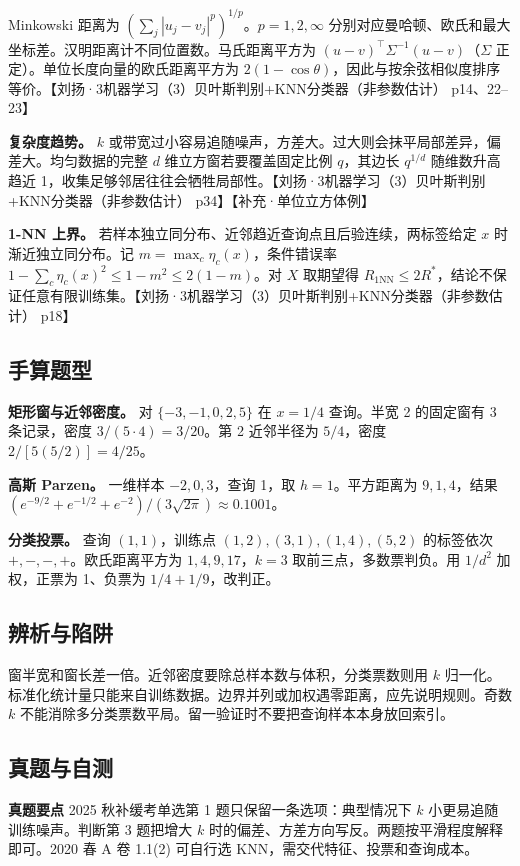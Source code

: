\documentclass[UTF8,a4paper,zihao=-4,fontset=fandol]{ctexart}
\begin{document}
Minkowski 距离为 \((\sum_j|u_j-v_j|^p)^{1/p}\)。\(p=1,2,\infty\) 分别对应曼哈顿、欧氏和最大坐标差。汉明距离计不同位置数。马氏距离平方为 \((u-v)^\top\Sigma^{-1}(u-v)\)（\(\Sigma\) 正定）。单位长度向量的欧氏距离平方为 \(2(1-\cos\theta)\)，因此与按余弦相似度排序等价。【刘扬·3机器学习（3）贝叶斯判别+KNN分类器（非参数估计） p14、22–23】

\textbf{复杂度趋势。} \(k\) 或带宽过小容易追随噪声，方差大。过大则会抹平局部差异，偏差大。均匀数据的完整 \(d\) 维立方窗若要覆盖固定比例 \(q\)，其边长 \(q^{1/d}\) 随维数升高趋近 1，收集足够邻居往往会牺牲局部性。【刘扬·3机器学习（3）贝叶斯判别+KNN分类器（非参数估计） p34】【补充·单位立方体例】

\textbf{1-NN 上界。} 若样本独立同分布、近邻趋近查询点且后验连续，两标签给定 \(x\) 时渐近独立同分布。记 \(m=\max_c\eta_c(x)\)，条件错误率 \(1-\sum_c\eta_c(x)^2\le1-m^2\le2(1-m)\)。对 \(X\) 取期望得 \(R_{1\mathrm{NN}}\le 2R^*\)，结论不保证任意有限训练集。【刘扬·3机器学习（3）贝叶斯判别+KNN分类器（非参数估计） p18】

\subsection{手算题型}
\textbf{矩形窗与近邻密度。} 对 \(\{-3,-1,0,2,5\}\) 在 \(x=1/4\) 查询。半宽 2 的固定窗有 3 条记录，密度 \(3/(5\cdot4)=3/20\)。第 2 近邻半径为 \(5/4\)，密度 \(2/[5(5/2)]=4/25\)。

\textbf{高斯 Parzen。} 一维样本 \(-2,0,3\)，查询 1，取 \(h=1\)。平方距离为 \(9,1,4\)，结果 \((e^{-9/2}+e^{-1/2}+e^{-2})/(3\sqrt{2\pi})\approx0.1001\)。

\textbf{分类投票。} 查询 \((1,1)\)，训练点 \((1,2),(3,1),(1,4),(5,2)\) 的标签依次 \(+,-,-,+\)。欧氏距离平方为 \(1,4,9,17\)，\(k=3\) 取前三点，多数票判负。用 \(1/d^2\) 加权，正票为 1、负票为 \(1/4+1/9\)，改判正。

\subsection{辨析与陷阱}
窗半宽和窗长差一倍。近邻密度要除总样本数与体积，分类票数则用 \(k\) 归一化。标准化统计量只能来自训练数据。边界并列或加权遇零距离，应先说明规则。奇数 \(k\) 不能消除多分类票数平局。留一验证时不要把查询样本本身放回索引。

\subsection{真题与自测}
\textbf{真题要点} 2025 秋补缓考单选第 1 题只保留一条选项：典型情况下 \(k\) 小更易追随训练噪声。判断第 3 题把增大 \(k\) 时的偏差、方差方向写反。两题按平滑程度解释即可。2020 春 A 卷 1.1(2) 可自行选 KNN，需交代特征、投票和查询成本。
\end{document}
